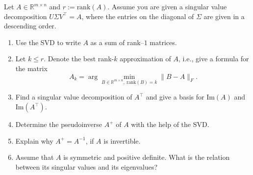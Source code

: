 Let $A \in \mathbb{R}^{m \times n}$ and $r:=\text{rank}(A)$. Assume you are given a singular value decomposition 
$U \Sigma V^\top = A$, where the 
entries on the diagonal of $\Sigma$ are given in a descending order.
	\begin{enumerate}
			\item Use the SVD to write $A$ as a sum of rank--$1$ matrices.
		\item Let $k \leq r$. Denote the best rank-$k$ approximation of $A$, i.e., give a formula for the matrix
		$$A_k = \arg \min_{B \in  \mathbb{R}^{m \times n},~ \text{rank}(B)=k  } \|B-A\|_F.$$ 
		\item Find a singular value decomposition of $A^\top$ and give a basis for $\text{Im}(A)$ and $\text{Im}(A^\top)$.		
		\item Determine the pseudoinverse $A^+$ of $A$ with the help of the SVD. 
		\item Explain why $A^+ = A^{-1}$, if $A$ is invertible.
		\item Assume that $A$ is symmetric and positive definite. What is the relation between its singular values and its eigenvalues?
	\end{enumerate}
 